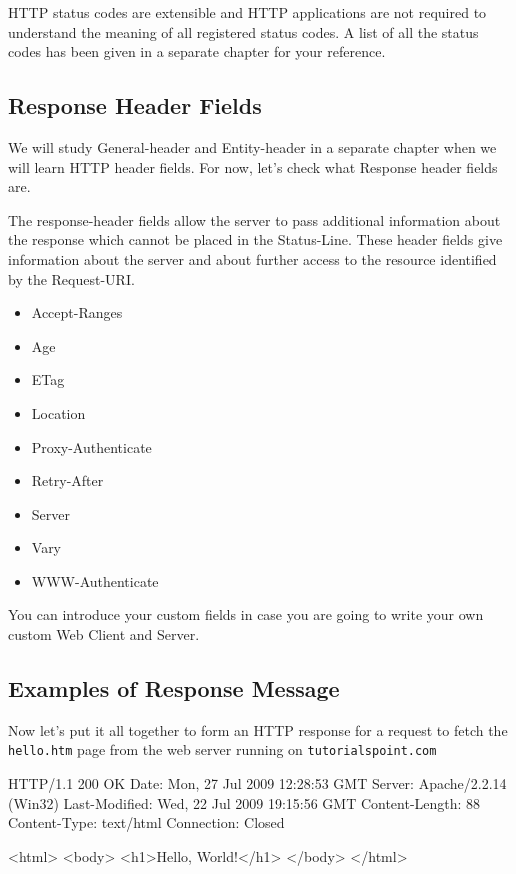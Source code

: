 \documentclass[a4paper,11pt,bahasa]{extarticle}
\begin{document}
HTTP status codes are extensible and HTTP applications are not required to understand the meaning of all 
registered status codes. A list of all the status codes has been given in a separate chapter for your 
reference.

\subsection{Response Header Fields}

We will study General-header and Entity-header in a separate chapter when we will learn HTTP header 
fields. For now, let's check what Response header fields are.

The response-header fields allow the server to pass additional information about the response which 
cannot be placed in the Status-Line. These header fields give information about the server and about 
further access to the resource identified by the Request-URI.
\begin{itemize}
\item Accept-Ranges
\item Age
\item ETag
\item Location
\item Proxy-Authenticate
\item Retry-After
\item Server
\item Vary
\item WWW-Authenticate
\end{itemize}

You can introduce your custom fields in case you are going to write your own custom
Web Client and Server.

\subsection{Examples of Response Message}

Now let's put it all together to form an HTTP response for a request to fetch the \verb|hello.htm| page
from the web server running on \verb|tutorialspoint.com|
\begin{textcode}
HTTP/1.1 200 OK
Date: Mon, 27 Jul 2009 12:28:53 GMT
Server: Apache/2.2.14 (Win32)
Last-Modified: Wed, 22 Jul 2009 19:15:56 GMT
Content-Length: 88
Content-Type: text/html
Connection: Closed

<html>
<body>
<h1>Hello, World!</h1>
</body>
</html>
\end{textcode}
\end{document}
